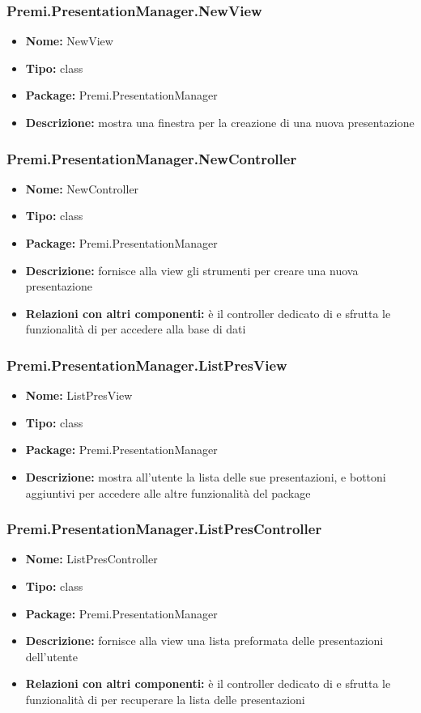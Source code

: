\subsubsection{Premi.PresentationManager.NewView}
\begin{itemize}
  \item \textbf{Nome:} NewView
  \item \textbf{Tipo:} class
  \item \textbf{Package:} Premi.PresentationManager
  \item \textbf{Descrizione:} mostra una finestra per la creazione di una nuova presentazione
\end{itemize}
\subsubsection{Premi.PresentationManager.NewController}
\begin{itemize}
  \item \textbf{Nome:} NewController
  \item \textbf{Tipo:} class
  \item \textbf{Package:} Premi.PresentationManager
  \item \textbf{Descrizione:} fornisce alla view gli strumenti per creare una nuova presentazione
  \item \textbf{Relazioni con altri componenti:} è il controller dedicato di   e sfrutta le funzionalità di  per accedere alla base di dati
\end{itemize}
\subsubsection{Premi.PresentationManager.ListPresView}
\begin{itemize}
  \item \textbf{Nome:} ListPresView
  \item \textbf{Tipo:} class
  \item \textbf{Package:} Premi.PresentationManager
  \item \textbf{Descrizione:} mostra all'utente la lista delle sue presentazioni, e bottoni aggiuntivi per accedere alle altre funzionalità del package
\end{itemize}
\subsubsection{Premi.PresentationManager.ListPresController}
\begin{itemize}
  \item \textbf{Nome:} ListPresController
  \item \textbf{Tipo:} class
  \item \textbf{Package:} Premi.PresentationManager
  \item \textbf{Descrizione:} fornisce alla view una lista preformata delle presentazioni dell'utente
  \item \textbf{Relazioni con altri componenti:} è il controller dedicato di   e sfrutta le funzionalità di  per recuperare la lista delle presentazioni
\end{itemize}
